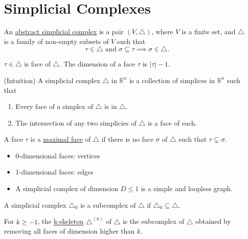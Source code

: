 \section{Simplicial Complexes}

\begin{defn}

	An \underline{abstract simplicial complex} is a pair $(V, \triangle)$, where $V$ is a finite set, and $\triangle$ is a family of non-empty subsets of $V$ such that 
	$$\tau \in \triangle \text{ and }\sigma \subseteq \tau \implies \sigma \in \triangle.$$
	
	$\tau \in \triangle $ is face of $\triangle$. The dimension of a face $\tau$ is $|\tau| - 1.$
	
	(Intuition) A simplicial complex $\triangle$ in $\mathbb{R}^n$ is a collection of simplices in $\mathbb{R}^n$ such that
	\begin{enumerate}
	    \item Every face of a simplex of $\triangle$ is in $\triangle$.
	    \item The intersection of any two simplicies of $\triangle$ is a face of each. 
	\end{enumerate}
\end{defn}

\begin{defn}

A face $\tau$ is a \underline{maximal face} of $\triangle$ if there is no face $\sigma$ of $\triangle$ such that $\tau \subsetneq \sigma.$
\begin{itemize}
    \item 0-dimensional faces: vertices
    \item 1-dimensional faces: edges
    \item A simplicial complex of dimension $D \leq 1$ is a simple and loopless graph.
\end{itemize}
\end{defn}

\begin{defn}[k-skeleton]

    A simplicial complex $\triangle_0$ is a subcomplex of $\triangle$ if $\triangle_0 \subseteq \triangle$.
    
    For $k\geq -1$, the \underline{k-skeleton} $\triangle^{(k)}$ of $\triangle$ is the subcomplex of $\triangle$ obtained by removing all faces of dimension higher than $k$. 
\end{defn}

